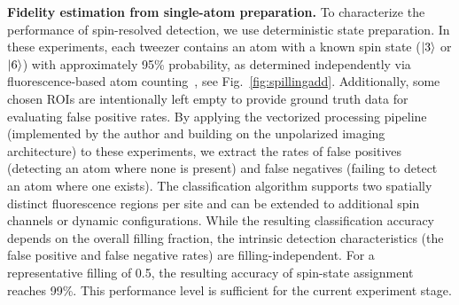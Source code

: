 \textbf{Fidelity estimation from single-atom preparation.} To characterize the performance of spin-resolved detection, we use deterministic state preparation. In these experiments, each tweezer contains an atom with a known spin state ($\left| 3 \right\rangle$ or $\left| 6 \right\rangle$) with approximately 95\% probability, as determined independently via fluorescence-based atom counting~\cite{dux_optical_2023}, see Fig.~\ref{fig:spillingadd}. Additionally, some chosen ROIs are intentionally left empty to provide ground truth data for evaluating false positive rates. By applying the vectorized processing pipeline (implemented by the author and building on the unpolarized imaging architecture) to these experiments, we extract the rates of false positives (detecting an atom where none is present) and false negatives (failing to detect an atom where one exists). The classification algorithm supports two spatially distinct fluorescence regions per site and can be extended to additional spin channels or dynamic configurations. While the resulting classification accuracy depends on the overall filling fraction, the intrinsic detection characteristics (the false positive and false negative rates) are filling-independent. For a representative filling of 0.5, the resulting accuracy of spin-state assignment reaches 99\%. This performance level is sufficient for the current experiment stage.